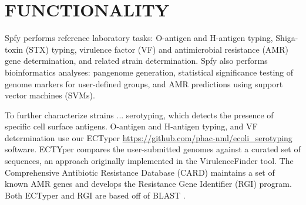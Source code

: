 \documentclass[a4,center,fleqn]{NAR}
\begin{document}

\enlargethispage{-65.1pt}



\section{FUNCTIONALITY}

Spfy performs reference laboratory tasks: O-antigen and H-antigen typing, Shiga-toxin (STX) typing,  virulence factor (VF) and antimicrobial resistance (AMR) gene determination, and related strain determination.
Spfy also performs bioinformatics analyses: pangenome generation, statistical significance testing of genome markers for user-defined groups, and AMR predictions using support vector machines (SVMs).

To further characterize strains ... serotyping, which detects the presence of specific cell surface antigens.
O-antigen and H-antigen typing, and VF determination use our ECTyper \url{https://github.com/phac-nml/ecoli_serotyping} software.
ECTYper compares the user-submitted genomes against a curated set of sequences, an approach originally implemented in the VirulenceFinder \cite{joensen2014real} tool.
The Comprehensive Antibiotic Resistance Database (CARD) \cite{mcarthur2013comprehensive} maintains a set of known AMR genes and develops the Resistance Gene Identifier (RGI) program.
Both ECTyper and RGI are based off of BLAST \cite{pmid2231712}.
\end{document}
